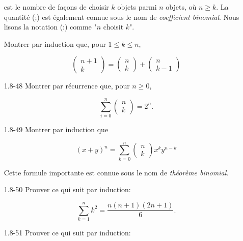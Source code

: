 \documentclass[10pt,twoside,a4paper]{book}
\begin{document}
\begin{enumerate}
  \noindent
  est le nombre de façons de choisir $k$ objets parmi $n$ objets, où $n \geq k$. La quantité (;) est également connue sous le nom de \textit{coefficient binomial}. Nous lisons la notation (:) comme "$n$ choisit $k$".
  
  \noindent
  Montrer par induction que, pour $1 \leq k \leq n$,

  \begin{equation}
    \begin{pmatrix}
      n+1 \\
      k 
    \end{pmatrix} =
    \begin{pmatrix}
      n \\
      k 
    \end{pmatrix} +
    \begin{pmatrix}
      n \\
      k-1 
    \end{pmatrix}
  \end{equation}
  \item[1.8-48] Montrer par récurrence que, pour $n \geq 0$,
  
  \begin{equation*}
    \sum_{i=0}^{n} \begin{pmatrix}
      n \\
      k 
    \end{pmatrix} =2^n.
  \end{equation*}
  \item[1.8-49] Montrer par induction que
  
  \begin{equation}
    \boxed{(x+y)^n = \sum_{k=0}^{n} \begin{pmatrix}
      n \\
      k 
    \end{pmatrix} x^k y^{n-k}}
  \end{equation}

  \noindent
  Cette formule importante est connue sous le nom de \textit{théorème binomial}.


  \item[1.8-50] Prouver ce qui suit par induction:
  
  \begin{equation*}
    \sum_{k=1}^{n}k^2 = \frac{n(n+1)(2n+1)}{6}.
  \end{equation*}
  \item[1.8-51] Prouver ce qui suit par induction:
  

\end{enumerate}
\end{document}
